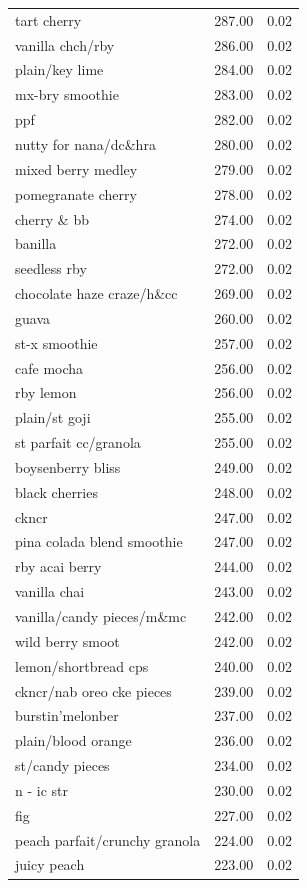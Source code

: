 \begin{table}
\begin{tabular}{lrr}
tart cherry & 287.00 & 0.02 \\
vanilla chch/rby & 286.00 & 0.02 \\
plain/key lime & 284.00 & 0.02 \\
mx-bry smoothie & 283.00 & 0.02 \\
ppf & 282.00 & 0.02 \\
nutty for nana/dc\&hra & 280.00 & 0.02 \\
mixed berry medley & 279.00 & 0.02 \\
pomegranate cherry & 278.00 & 0.02 \\
cherry \& bb & 274.00 & 0.02 \\
banilla & 272.00 & 0.02 \\
seedless rby & 272.00 & 0.02 \\
chocolate haze craze/h\&cc & 269.00 & 0.02 \\
guava & 260.00 & 0.02 \\
st-x smoothie & 257.00 & 0.02 \\
cafe mocha & 256.00 & 0.02 \\
rby lemon & 256.00 & 0.02 \\
plain/st goji & 255.00 & 0.02 \\
st parfait cc/granola & 255.00 & 0.02 \\
boysenberry bliss & 249.00 & 0.02 \\
black cherries & 248.00 & 0.02 \\
ckncr & 247.00 & 0.02 \\
pina colada blend smoothie & 247.00 & 0.02 \\
rby acai berry & 244.00 & 0.02 \\
vanilla chai & 243.00 & 0.02 \\
vanilla/candy pieces/m\&mc & 242.00 & 0.02 \\
wild berry smoot & 242.00 & 0.02 \\
lemon/shortbread cps & 240.00 & 0.02 \\
ckncr/nab oreo cke pieces & 239.00 & 0.02 \\
burstin'melonber & 237.00 & 0.02 \\
plain/blood orange & 236.00 & 0.02 \\
st/candy pieces & 234.00 & 0.02 \\
n - ic str & 230.00 & 0.02 \\
fig & 227.00 & 0.02 \\
peach parfait/crunchy granola & 224.00 & 0.02 \\
juicy peach & 223.00 & 0.02 \\

\end{tabular}
\end{table}
